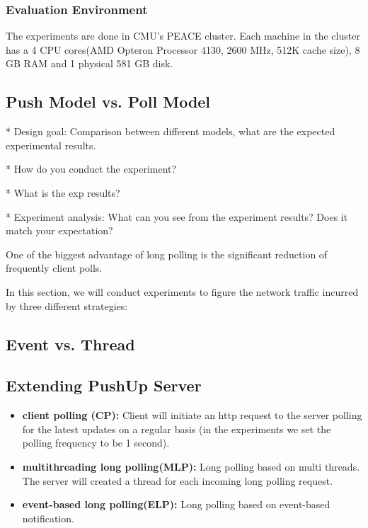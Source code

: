 \subsubsection{Evaluation Environment \\}
The experiments are done in CMU's PEACE cluster. Each machine in the cluster has a 4 CPU cores(AMD Opteron Processor 4130, 2600 MHz, 512K cache size), 8 GB RAM and 1 physical 581 GB disk.

\subsection{Push Model vs. Poll Model\\}

* Design goal: Comparison between different models, what are the expected experimental results.

* How do you conduct the experiment?

* What is the exp results?

* Experiment analysis: What can you see from the experiment results? Does it match your expectation?

One of the biggest advantage of long polling is the significant reduction of frequently client polls.

In this section, we will conduct experiments to figure the network traffic incurred by three different strategies:

\subsection{Event vs. Thread\\}


\subsection{Extending PushUp Server}


\begin{itemize}
    \item {\bf client polling (CP): } Client will initiate an http request to the server polling for the latest updates on a regular basis (in the experiments we set the polling frequency to be 1 second).
    \item {\bf multithreading long polling(MLP): } Long polling based on multi threads. The server will created a thread for each incoming long polling request.
    \item {\bf event-based long polling(ELP): }Long polling based on event-based notification.
\end{itemize}

